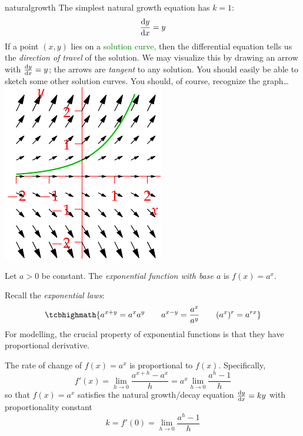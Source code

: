 \begin{example}[lower separated=false, sidebyside, sidebyside align=top seam, sidebyside gap=0pt, righthand width=0.28\linewidth]{}{naturalgrowth}
	The simplest natural growth equation has $k=1$:
	\[
		\diff[y]{x}=y
	\]
	If a point $(x,y)$ lies on a \textcolor{Green}{solution curve,} then the differential equation tells us the \emph{direction of travel} of the solution. We may visualize this by drawing an arrow with  $\diff[y]{x}=y$; the arrows are \emph{tangent} to any solution.\footnotemark{} You should easily be able to sketch some other solution curves.\smallbreak
	You should, of course, recognize the graph\ldots
	\tcblower
	\flushright\includegraphics[scale=1]{slopefields-01}
\end{example}



\begin{defn}{}{}
	Let $a>0$ be constant. The \emph{exponential function with base $a$} is $f(x)=a^x$.
\end{defn}

Recall the \emph{exponential laws}:\label{pg:explaws}
\[
	\tcbhighmath{a^{x+y}=a^xa^y\qquad a^{x-y}=\frac{a^x}{a^y}\qquad (a^x)^r=a^{rx}}
\]
For modelling, the crucial property of exponential functions is that they have proportional derivative.

\begin{thm}{}{}
	The rate of change of $f(x)=a^x$ is proportional to $f(x)$. Specifically,
	\[
		f'(x)=\lim_{h\to 0}\frac{a^{x+h}-a^x}h=a^x\lim_{h\to 0}\frac{a^{h}-1}h
	\]
	so that $f(x)=a^x$ satisfies the natural growth/decay equation $\diff[y]{x}=ky$ with proportionality constant
	\[
		k=f'(0)=\lim_{h\to 0}\frac{a^{h}-1}h
	\]
\end{thm}

